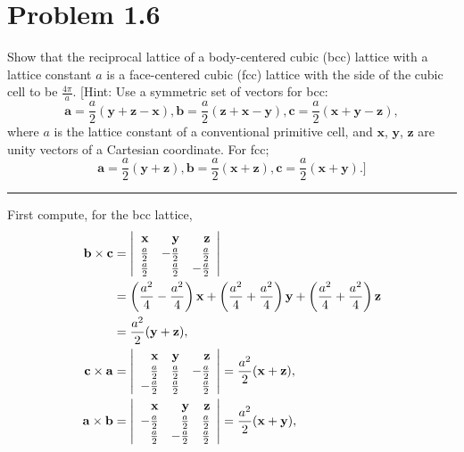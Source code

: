 \documentclass{article}
\newcommand{\horline}
           {\begin{center}
              \noindent\rule{8cm}{0.4pt}
            \end{center}}
\begin{document}
\section*{Problem 1.6}
Show that the reciprocal lattice of a body-centered cubic (bcc) lattice with
a lattice constant $a$ is a face-centered cubic (fcc) lattice with the side
of the cubic cell to be $\frac{4\pi}{a}$. 
[Hint: Use a symmetric set of vectors for bcc:
$$
\mathbf{a} = \frac{a}{2}(\mathbf{y} + \mathbf{z} - \mathbf{x}),
\mathbf{b} = \frac{a}{2}(\mathbf{z} + \mathbf{x} - \mathbf{y}),
\mathbf{c} = \frac{a}{2}(\mathbf{x} + \mathbf{y} - \mathbf{z}),
$$
where $a$ is the lattice constant of a conventional primitive cell, and
$\mathbf{x}$, $\mathbf{y}$, $\mathbf{z}$ are unity vectors of a Cartesian
coordinate. For fcc;
$$
\mathbf{a} = \frac{a}{2}(\mathbf{y} + \mathbf{z}),
\mathbf{b} = \frac{a}{2}(\mathbf{x} + \mathbf{z}),
\mathbf{c} = \frac{a}{2}(\mathbf{x} + \mathbf{y}).]
$$
\horline
First compute, for the bcc lattice,
\begin{align*}
  \mathbf{b} \times \mathbf{c} &=
  \left|\begin{array}{r r r}
    \mathbf{x} & \mathbf{y} & \mathbf{z} \\
     \frac{a}{2} & -\frac{a}{2} &  \frac{a}{2} \\
     \frac{a}{2} &  \frac{a}{2} & -\frac{a}{2}
  \end{array}\right| \\
&= \left(\frac{a^2}{4} - \frac{a^2}{4}\right) \mathbf{x} 
 + \left(\frac{a^2}{4} + \frac{a^2}{4}\right) \mathbf{y} 
 + \left(\frac{a^2}{4} + \frac{a^2}{4}\right) \mathbf{z} \\
&= \frac{a^2}{2} (\mathbf{y} + \mathbf{z}), \\
  \mathbf{c} \times \mathbf{a} &=
  \left|\begin{array}{r r r}
    \mathbf{x} & \mathbf{y} & \mathbf{z} \\
     \frac{a}{2} &  \frac{a}{2} & -\frac{a}{2} \\
    -\frac{a}{2} &  \frac{a}{2} &  \frac{a}{2} 
  \end{array}\right| 
= \frac{a^2}{2}(\mathbf{x} + \mathbf{z}), \\
  \mathbf{a} \times \mathbf{b} &=
  \left|\begin{array}{r r r}
    \mathbf{x} & \mathbf{y} & \mathbf{z} \\
    -\frac{a}{2} &  \frac{a}{2} &  \frac{a}{2} \\
     \frac{a}{2} & -\frac{a}{2} &  \frac{a}{2} 
  \end{array}\right| 
= \frac{a^2}{2}(\mathbf{x} + \mathbf{y}),
\end{align*}
\end{document}
